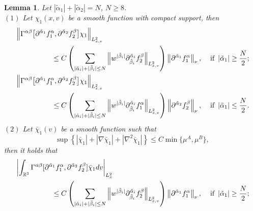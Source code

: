 \documentclass[reqno]{amsart}
\numberwithin{equation}{section}
\newtheorem{lemma}[theorem]{Lemma}
\numberwithin{equation}{section}
\begin{document}
	\begin{lemma}
		Let $|\tilde{\alpha}_1|+|\tilde{\alpha}_2|=N$, $N \geq 8$. \\
	$(1)$
		Let $\chi_{1}(x, v)$ be a smooth function with compact support, then 
		\begin{align}
			&\left\| \Gamma^{\alpha \beta} \big[\partial^{\tilde{\alpha}_1}f^{\alpha}_1, \partial^{\tilde{\alpha}_2}f^{\beta}_2\big] \chi_1 \right\|_{L^{2}_{x,v}}\notag\\
			&\hspace{1.8cm} \leq C \left( \sum_{| \tilde{\alpha}_i |+| \tilde{\beta}_i | \le N} \left\| w^{| \tilde{\beta}_i |} \partial_{\tilde{\beta}_i}^{\tilde{\alpha}_i}f^{\beta}_2 \right\|_{L^{2}_{x,v}} \right) \left\| \partial^{\tilde{\alpha}_1}f^{\alpha}_1 \right\|_{\nu},\hspace{0.4cm} \text{if}\ \left| \tilde{\alpha}_1 \right| \geq \frac{N}{2};\label{soacl6464}\\
			&\left\| \Gamma^{\alpha \beta} \big[\partial^{\tilde{\alpha}_1}f^{\alpha}_1, \partial^{\tilde{\alpha}_2}f^{\beta}_2\big] \chi_1 \right\|_{L^{2}_{x,v}}\notag\\
			&\hspace{1.8cm} \leq C \left( \sum_{| \tilde{\alpha}_i |+| \tilde{\beta}_i | \leq N} \left\| w^{| \tilde{\beta}_i |} \partial_{\tilde{\beta}_i}^{\tilde{\alpha}_i} f^{\alpha}_1\right\|_{L^{2}_{x,v}} \right) \left\| \partial^{\tilde{\alpha}_2}f^{\beta}_2 \right\|_{\nu},\hspace{0.4cm} \text{if}\ \left| \tilde{\alpha}_1 \right| \leq \frac{N}{2}.\label{soacl64642}
		\end{align}
		$(2)$
		Let $\bar{\chi}_1(v)$ be a smooth function such that
		$$
		\sup\left\{ \left| \bar{\chi}_1 \right|+\left| \nabla \bar{\chi}_1 \right|+\left| \nabla^2 \bar{\chi}_1 \right| \right\} \leq C \min \{\mu^A ,\mu^B \},
		$$
		then it holds that
		\begin{align}
			&\left| \int_{\mathbb{R}^3} \Gamma^{\alpha \beta} [\partial^{\tilde{\alpha}_1}f^{\alpha}_1, \partial^{\tilde{\alpha}_2}f^{\beta}_2] \bar{\chi}_1 dv \right|_{L^{2}_{x}} \notag\\
			&\hspace{1.8cm}\leq C \left( \sum_{| \tilde{\alpha}_i |+| \tilde{\beta}_i | \le N} \left\| w^{| \tilde{\beta}_i |} \partial_{\tilde{\beta}_i}^{\tilde{\alpha}_i}f^{\beta}_2 \right\|_{L^{2}_{x,v}} \right) \left\| \partial^{\tilde{\alpha}_1}f^{\alpha}_1 \right\|_{\nu},\hspace{0.4cm} \text{if}\ \left| \tilde{\alpha}_1 \right| \geq \frac{N}{2};\label{soacl6565}\\

\end{align}
\end{lemma}
\end{document}

